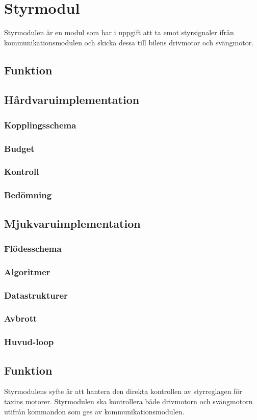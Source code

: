 \documentclass[designspec/spec.tex]{subfiles}
\begin{document}
\section{Styrmodul}
Styrmodulen är en modul som har i uppgift att ta emot styrsignaler ifrån
kommunikationsmodulen och skicka dessa till bilens drivmotor och svängmotor.

\subsection{Funktion}

\subsection{Hårdvaruimplementation}
\subsubsection{Kopplingsschema}

\subsubsection{Budget}

\subsubsection{Kontroll}

\subsubsection{Bedömning}

\subsection{Mjukvaruimplementation}

\subsubsection{Flödesschema}

\subsubsection{Algoritmer}

\subsubsection{Datastrukturer}

\subsubsection{Avbrott}

\subsubsection{Huvud-loop}

\subsection{Funktion}
Styrmodulens syfte är att hantera den direkta kontrollen av styrreglagen för
taxins motorer. Styrmodulen ska kontrollera både drivmotorn och svängmotorn
utifrån kommandon som ges av kommunikationsmodulen.
\end{document}
